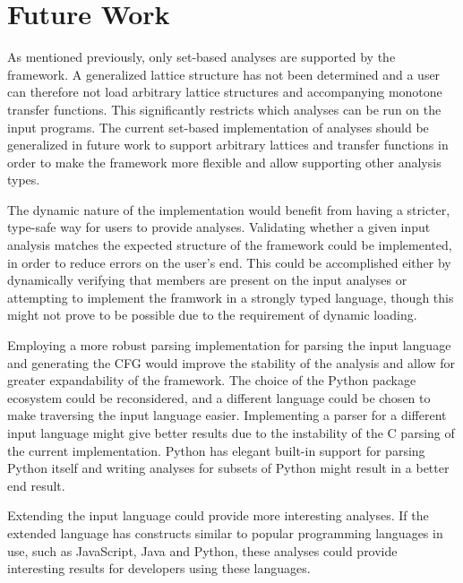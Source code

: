 \section{Future Work}
\label{futurework}

\newpar As mentioned previously, only set-based analyses are supported by the framework. A generalized lattice structure has not been determined and a user can therefore not load arbitrary lattice structures and accompanying monotone transfer functions. This significantly restricts which analyses can be run on the input programs. The current set-based implementation of analyses should be generalized in future work to support arbitrary lattices and transfer functions in order to make the framework more flexible and allow supporting other analysis types. 

\newpar The dynamic nature of the implementation would benefit from having a stricter, type-safe way for users to provide analyses. Validating whether a given input analysis matches the expected structure of the framework could be implemented, in order to reduce errors on the user's end. This could be accomplished either by dynamically verifying that members are present on the input analyses or attempting to implement the framwork in a strongly typed language, though this might not prove to be possible due to the requirement of dynamic loading.

\newpar Employing a more robust parsing implementation for parsing the input language and generating the CFG would improve the stability of the analysis and allow for greater expandability of the framework. The choice of the Python package ecosystem could be reconsidered, and a different language could be chosen to make traversing the input language easier. Implementing a parser for a different input language might give better results due to the instability of the C parsing of the current implementation. Python has elegant built-in support for parsing Python itself and writing analyses for subsets of Python might result in a better end result.

\newpar Extending the input language could provide more interesting analyses. If the extended language has constructs similar to popular programming languages in use, such as JavaScript, Java and Python\cite{github:languages}, these analyses could provide interesting results for developers using these languages.